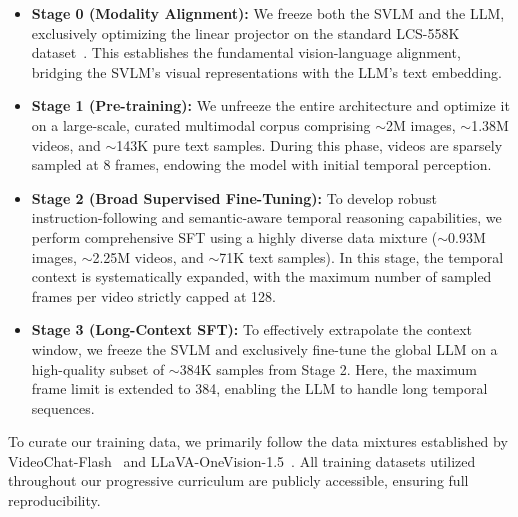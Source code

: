 \begin{itemize}
    \item \textbf{Stage 0 (Modality Alignment):} We freeze both the SVLM and the LLM, exclusively optimizing the linear projector on the standard LCS-558K dataset~\cite{liu2023visual}. This establishes the fundamental vision-language alignment, bridging the SVLM's visual representations with the LLM's text embedding.
    
    \item \textbf{Stage 1 (Pre-training):} We unfreeze the entire architecture and optimize it on a large-scale, curated multimodal corpus comprising $\sim$2M images, $\sim$1.38M videos, and $\sim$143K pure text samples. During this phase, videos are sparsely sampled at 8 frames, endowing the model with initial temporal perception.
    
    \item \textbf{Stage 2 (Broad Supervised Fine-Tuning):} To develop robust instruction-following and semantic-aware temporal reasoning capabilities, we perform comprehensive SFT using a highly diverse data mixture ($\sim$0.93M images, $\sim$2.25M videos, and $\sim$71K text samples). In this stage, the temporal context is systematically expanded, with the maximum number of sampled frames per video strictly capped at 128.
    
    \item \textbf{Stage 3 (Long-Context SFT):} To effectively extrapolate the context window, we freeze the SVLM and exclusively fine-tune the global LLM on a high-quality subset of $\sim$384K samples from Stage 2. Here, the maximum frame limit is extended to 384, enabling the LLM to handle long temporal sequences.
    
\end{itemize}
%
To curate our training data, we primarily follow the data mixtures established by VideoChat-Flash~\cite{li2024videochat} and LLaVA-OneVision-1.5~\cite{an2025llava}. All training datasets utilized throughout our progressive curriculum are publicly accessible, ensuring full reproducibility.

